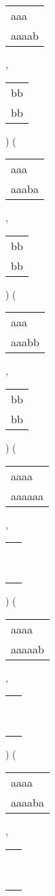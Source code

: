 \begin{description}
\begin{tabular}{|l|}
aaa\ \  \\
aaaab \\
\hline
\end{tabular} 
 , 
\begin{tabular}{|l|} \hline
bb \\
bb \\
\hline
\end{tabular} 
) 
 ( 
\begin{tabular}{|l|} \hline
aaa\ \  \\
aaaba \\
\hline
\end{tabular} 
 , 
\begin{tabular}{|l|} \hline
bb \\
bb \\
\hline
\end{tabular} 
) 
 ( 
\begin{tabular}{|l|} \hline
aaa\ \  \\
aaabb \\
\hline
\end{tabular} 
 , 
\begin{tabular}{|l|} \hline
bb \\
bb \\
\hline
\end{tabular} 
) 
 ( 
\begin{tabular}{|l|} \hline
aaaa\ \  \\
aaaaaa \\
\hline
\end{tabular} 
 , 
\begin{tabular}{|l|} \hline
\ \\ \ \\ \hline
\end{tabular} 
) 
 ( 
\begin{tabular}{|l|} \hline
aaaa\ \  \\
aaaaab \\
\hline
\end{tabular} 
 , 
\begin{tabular}{|l|} \hline
\ \\ \ \\ \hline
\end{tabular} 
) 
 ( 
\begin{tabular}{|l|} \hline
aaaa\ \  \\
aaaaba \\
\hline
\end{tabular} 
 , 
\begin{tabular}{|l|} \hline
\ \\ \ \\ \hline

\end{tabular}
\end{description}
